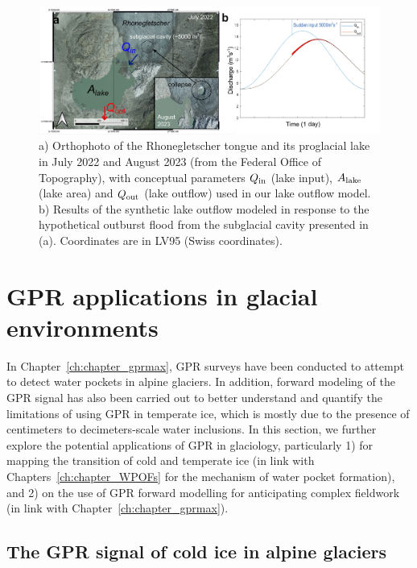 \begin{figure}[h]
    \centering
    \includegraphics[width=1\textwidth]{chapters/Discussion/WP_rhone.pdf}
    \caption{a) Orthophoto of the Rhonegletscher tongue and its proglacial lake in July 2022 and August 2023 (from the Federal Office of Topography), with conceptual parameters $Q_{\rm in}$ (lake input), $A_{\rm lake}$ (lake area) and $Q_{\rm out}$ (lake outflow) used in our lake outflow model. b) Results of the synthetic lake outflow modeled in response to the hypothetical outburst flood from the subglacial cavity presented in (a). Coordinates are in LV95 (Swiss coordinates).}
    \label{fig:WP_rhone}
\end{figure}



\section{GPR applications in glacial environments}

In Chapter~\ref{ch:chapter_gprmax}, GPR surveys have been conducted to attempt to detect water pockets in alpine glaciers. In addition, forward modeling of the GPR signal has also been carried out to better understand and quantify the limitations of using GPR in temperate ice, which is mostly due to the presence of centimeters to decimeters-scale water inclusions. In this section, we further explore the potential applications of GPR in glaciology, particularly 1) for mapping the transition of cold and temperate ice (in link with Chapters~\ref{ch:chapter_WPOFs} for the mechanism of water pocket formation), and 2) on the use of GPR forward modelling for anticipating complex fieldwork (in link with Chapter~\ref{ch:chapter_gprmax}).


\subsection{The GPR signal of cold ice in alpine glaciers}


